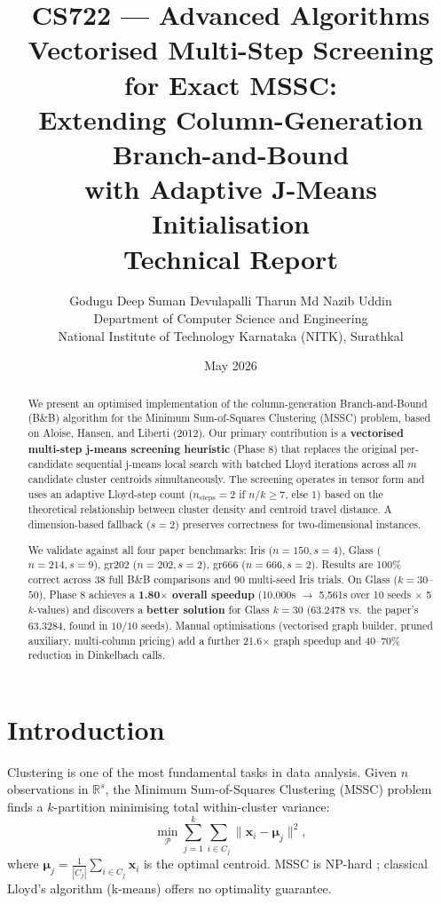 \documentclass[12pt,a4paper]{article}
\title{
  \vspace{-1cm}
  {\Large CS722 — Advanced Algorithms} \\[0.5em]
  {\LARGE \textbf{Vectorised Multi-Step Screening for Exact MSSC:}} \\[0.3em]
  {\Large Extending Column-Generation Branch-and-Bound} \\[0.3em]
  {\Large with Adaptive J-Means Initialisation} \\[1em]
  {\large Technical Report}
}
\author{
  Godugu Deep Suman \quad Devulapalli Tharun \quad Md Nazib Uddin \\[0.5em]
  Department of Computer Science and Engineering \\
  National Institute of Technology Karnataka (NITK), Surathkal
}
\date{May 2026}
\begin{document}
\maketitle
\thispagestyle{empty}
\newpage

\begin{abstract}
We present an optimised implementation of the column-generation Branch-and-Bound (B\&B) algorithm for the Minimum Sum-of-Squares Clustering (MSSC) problem, based on Aloise, Hansen, and Liberti (2012). Our primary contribution is a \textbf{vectorised multi-step j-means screening heuristic} (Phase 8) that replaces the original per-candidate sequential j-means local search with batched Lloyd iterations across all $m$ candidate cluster centroids simultaneously. The screening operates in tensor form and uses an adaptive Lloyd-step count ($n_\text{steps} = 2$ if $n/k \geq 7$, else $1$) based on the theoretical relationship between cluster density and centroid travel distance. A dimension-based fallback ($s=2$) preserves correctness for two-dimensional instances.

We validate against all four paper benchmarks: Iris ($n=150, s=4$), Glass ($n=214, s=9$), gr202 ($n=202, s=2$), gr666 ($n=666, s=2$). Results are 100\% correct across 38 full B\&B comparisons and 90 multi-seed Iris trials. On Glass ($k=30$--$50$), Phase 8 achieves a \textbf{1.80$\times$ overall speedup} (10{,}000s $\to$ 5{,}561s over 10 seeds $\times$ 5 $k$-values) and discovers a \textbf{better solution} for Glass $k=30$ ($63.2478$ vs.\ the paper's $63.3284$, found in $10/10$ seeds). Manual optimisations (vectorised graph builder, pruned auxiliary, multi-column pricing) add a further 21.6$\times$ graph speedup and 40--70\% reduction in Dinkelbach calls.
\end{abstract}

\newpage\tableofcontents\newpage

\section{Introduction}
\label{sec:intro}

Clustering is one of the most fundamental tasks in data analysis. Given $n$ observations in $\mathbb{R}^s$, the Minimum Sum-of-Squares Clustering (MSSC) problem finds a $k$-partition minimising total within-cluster variance:
\begin{equation}
  \min_{\mathcal{P}} \sum_{j=1}^{k} \sum_{i \in C_j} \|\mathbf{x}_i - \boldsymbol{\mu}_j\|^2,
  \label{eq:mssc}
\end{equation}
where $\boldsymbol{\mu}_j = \frac{1}{|C_j|}\sum_{i\in C_j}\mathbf{x}_i$ is the optimal centroid. MSSC is NP-hard \citep{aloise2009}; classical Lloyd's algorithm (k-means) offers no optimality guarantee.
\end{document}
